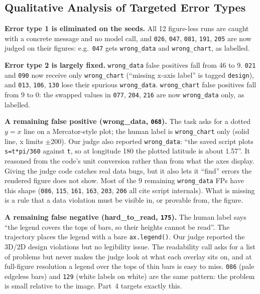 \documentclass[11pt]{article}
\newcommand{\run}[1]{\texttt{#1}}
\begin{document}
\subsection{Qualitative Analysis of Targeted Error Types}
\textbf{Error type 1 is eliminated on the seeds.} All 12 figure-less runs are
caught with a concrete message and no model call, and \run{026}, \run{047},
\run{081}, \run{191}, \run{205} are now judged on their figures: e.g.\ \run{047}
gets \texttt{wrong\_data} and \texttt{wrong\_chart}, as labelled.

\textbf{Error type 2 is largely fixed.} \texttt{wrong\_data} false positives fall
from 46 to 9. \run{021} and \run{090} now receive only \texttt{wrong\_chart}
(``missing x-axis label'' is tagged \texttt{design}), and \run{013}, \run{106},
\run{130} lose their spurious \texttt{wrong\_data}. \texttt{wrong\_chart}
false positives fall from 9 to 0: the swapped values in \run{077}, \run{204},
\run{216} are now \texttt{wrong\_data} only, as labelled.

\textbf{A remaining false positive (wrong\_data, \run{068}).} The task asks for
a dotted $y=x$ line on a Mercator-style plot; the human label is
\texttt{wrong\_chart} only (solid line, x limits $\pm$200). Our judge also
reported \texttt{wrong\_data}: ``the saved script plots
\texttt{s=t*pi/360} against \texttt{t}, so at longitude 180 the plotted latitude
is about 1.57''. It reasoned from the code's unit conversion rather than from
what the axes display. Giving the judge code catches real data bugs, but it also
lets it ``find'' errors the rendered figure does not show. Most of the 9
remaining \texttt{wrong\_data} FPs have this shape (\run{086}, \run{115},
\run{161}, \run{163}, \run{203}, \run{206} all cite script internals). What is
missing is a rule that a data violation must be visible in, or provable from,
the figure.

\textbf{A remaining false negative (hard\_to\_read, \run{175}).} The human label
says ``the legend covers the tops of bars, so their heights cannot be read''.
The trajectory places the legend with a bare \texttt{ax.legend()}. Our judge
reported the 3D/2D design violations but no legibility issue. The readability
call asks for a list of problems but never makes the judge look at what each
overlay sits on, and at full-figure resolution a legend over the tops of thin
bars is easy to miss. \run{086} (pale edgeless bars) and \run{129} (white labels
on white) are the same pattern: the problem is small relative to the image.
Part~4 targets exactly this.
\end{document}
